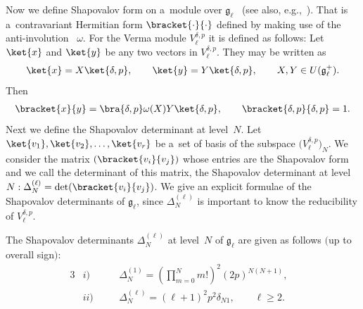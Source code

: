 Now we def\/ine Shapovalov form on a~module over $ {\mathfrak g}_{\ell} $~\cite{Shapo} (see also, e.g.,~\cite{KacRai}).
That is a~contravariant Hermitian form $ \bracket{\cdot}{\cdot} $ def\/ined by making use of the anti-involution~ $\omega$.
For the Verma module $ V^{\delta,p}_{\ell} $ it is def\/ined as follows:   Let $ \ket{x} $ and $ \ket{y} $ be any two
vectors in $ V^{\delta,p}_{\ell}$.
They may be written as
\begin{gather*}
\ket{x} = X \ket{\delta,p},
\qquad
\ket{y} = Y \ket{\delta,p},
\qquad
X, Y \in U({\mathfrak g}_{\ell}^+).
\end{gather*}
Then
\begin{gather}
\bracket{x}{y} = \bra{\delta,p} \omega(X) Y \ket{\delta,p},
\qquad
\bracket{\delta,p}{\delta,p} = 1.
\label{innerprod-def}
\end{gather}
Next we def\/ine the Shapovalov determinant at level~$N$.
Let $ \ket{v_1}, \ket{v_2}, \dots, \ket{v_r} $ be a~set of basis of the subspace $ \big(V^{\delta,p}_{\ell}\big)_N$.
We consider the matrix $ (\bracket{v_i}{v_j}) $ whose entries are     the Shapovalov form and we call the determinant of
this matrix, the Shapovalov determinant at level $N: \Delta^{(\ell)}_N = \det (\bracket{v_i}{v_j})$.
We give an explicit formulae of the Shapovalov determinants of $ {\mathfrak g}_{\ell}$, since $ \Delta^{(\ell)}_N $ is
important to know the reducibility of $V^{\delta,p}_{\ell}$.
\begin{proposition}\label{prop1}
The Shapovalov determinants $ \Delta^{(\ell)}_N$ at level~$N$ of ${\mathfrak g}_{\ell}$ are given as follows $($up to
overall sign$)$:
\begin{alignat}{3}
   & i)
\quad &&
\Delta_N^{(1)} = \left(\prod\limits_{m=0}^N m! \right)^2 (2p)^{N(N+1)},&
\label{KDl1}
\\
  &   ii)
\quad &&
\Delta^{(\ell)}_N = (\ell+1)^2   p^2   \delta_{N1},
\qquad
\ell \geq 2.&
\end{alignat}
\end{proposition}

